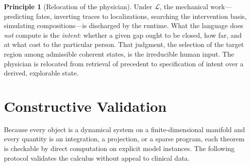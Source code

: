 \documentclass[11pt,a4paper]{article}
\theoremstyle{thmstyle}
\theoremstyle{definition}
\newtheorem{principle}[theorem]{Principle}
\theoremstyle{remark}
\newcommand{\dsl}{\mathcal{L}}          %
\begin{document}
\begin{principle}[Relocation of the physician]
\label{prin:relocate}
Under $\dsl$, the mechanical work---predicting fates, inverting traces to
localizations, searching the intervention basis, simulating
compositions---is discharged by the runtime. What the language does
\emph{not} compute is the \emph{intent}: whether a given gap ought to be
closed, how far, and at what cost to the particular person. That judgment,
the selection of the target region among admissible coherent states, is the
irreducible human input. The physician is relocated from retrieval of
precedent to specification of intent over a derived, explorable state.
\end{principle}

\section{Constructive Validation}
\label{sec:validation}

Because every object is a dynamical system on a finite-dimensional manifold
and every quantity is an integration, a projection, or a sparse program,
each theorem is checkable by direct computation on explicit model
instances. The following protocol validates the calculus without appeal to
clinical data.
\end{document}
